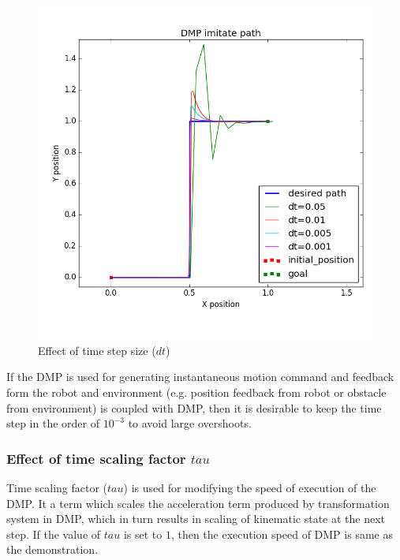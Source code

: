 \begin{figure}[H]
	\includegraphics[width=\textwidth]{images/dt_.png}
	\caption{Effect of time step size ($dt$)}
	\label{fig:dt_}
\end{figure}


If the DMP is used for generating instantaneous motion command and feedback form the robot and environment (e.g. position feedback from robot or obstacle from environment) is coupled with DMP, then it is desirable to keep the time step in the order of $10^{-3}$ to avoid large overshoots. 

\subsubsection{Effect of time scaling factor $tau$}   

Time scaling factor ($tau$) is used for modifying the speed of execution of the DMP. It a term which scales the acceleration term produced by transformation system in DMP, which in turn results in scaling of kinematic state at the next step. If the value of $tau$ is set to $1$, then the execution speed of DMP is same as the demonstration. 

